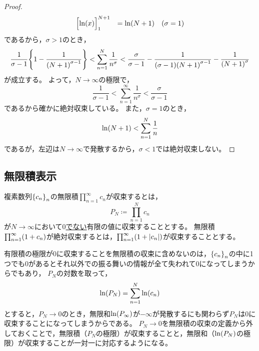 \documentclass[a4paper,draft]{ltjsarticle}
\begin{document}
\begin{prop}[絶対収束域]
\begin{proof}
\begin{equation}
{\begin{aligned}
\begin{array}{rll}
                        \bsqu{\fun{\ln}{x}}_1^{N+1} &= \fun{\ln}{N+1} &\pare{\sigma = 1}
                    \end{array}
                \end{aligned}          
            }
        \end{equation}
        であるから，$\sigma>1$のとき，
        \begin{equation}
            \frac{1}{\sigma-1}\bra{1-\frac{1}{\pare{N+1}^{\sigma-1}}} < \sum_{n=1}^N \frac{1}{n^\sigma} < \frac{\sigma}{\sigma-1}-\frac{1}{\pare{\sigma-1}\pare{N+1}^{\sigma-1}}-\frac{1}{\pare{N+1}^\sigma}
        \end{equation}
        が成立する。
        よって，$N\to\infty$の極限で，
        \begin{equation}
            \frac{1}{\sigma-1} < \sum_{n=1}^\infty \frac{1}{n^\sigma} < \frac{\sigma}{\sigma-1}
        \end{equation}
        であるから確かに絶対収束している。
        また，$\sigma=1$のとき，
        \begin{equation}
            \fun{\ln}{N+1}<\sum_{n=1}^N \frac{1}{n}
        \end{equation}
        であるが，左辺は$N\to\infty$で発散するから，$\sigma<1$では絶対収束しない。
    \end{proof}
\end{prop}

\subsection{無限積表示}
\begin{defi}[無限積の収束]\label{def:RiemannZeta-infprod}
    複素数列$\seq{c_n}{n}$の無限積$\prod_{n=1}^\infty c_n$が収束するとは，
    \begin{equation}
        P_N\coloneqq \prod_{n=1}^N c_n
    \end{equation}
    が$N\to\infty$において\underline{$0$でない}有限の値に収束することとする。
    無限積$\prod_{n=1}^\infty \pare{1+c_n}$が絶対収束するとは，$\prod_{n=1}^\infty \pare{1+\abs{c_n}}$が収束することとする。
\end{defi}

\begin{rem}
    有限積の極限が$0$に収束することを無限積の収束に含めないのは，$\seq{c_n}{n}$の中に1つでも$0$があるとそれ以外での振る舞いの情報が全て失われて$0$になってしまうからでもあり，
    $P_N$の対数を取って，
    \begin{equation}
        \fun{\ln}{P_N} = \sum_{n=1}^N \fun{\ln}{c_n}
    \end{equation}
    とすると，$P_N\to0$のとき，無限和$\fun{\ln}{P_\infty}$が$-\infty$が発散するにも関わらず$P_N$は$0$に収束することになってしまうからである。
    $P_N\to0$を無限積の収束の定義から外しておくことで，無限積（$P_N$の極限）が収束することと，無限和（$\fun{\ln}{P_N}$の極限）が収束することが一対一に対応するようになる。
\end{rem}
\end{document}
